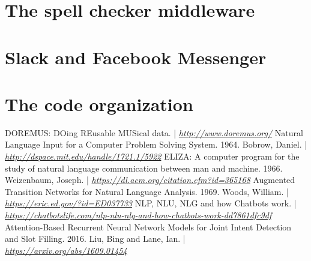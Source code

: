 \documentclass[a4paper,12pt]{report}
\begin{document}
	\section{The spell checker middleware}
	\section{Slack and Facebook Messenger}
	\section{The code organization}
	
	\begin{thebibliography}{9}
		 DOREMUS: DOing REusable MUSical data. | \textit{\href{http://www.doremus.org/}{http://www.doremus.org/}}
		 Natural Language Input for a Computer Problem Solving System. 1964. Bobrow, Daniel. | \textit{\href{http://dspace.mit.edu/handle/1721.1/5922}{http://dspace.mit.edu/handle/1721.1/5922}}
		 ELIZA: A computer program for the study of natural language communication between man and machine. 1966. Weizenbaum, Joseph. | \textit{\href{https://dl.acm.org/citation.cfm?id=365168}{https://dl.acm.org/citation.cfm?id=365168}}
		 Augmented Transition Networks for Natural Language Analysis. 1969. Woods, William. | \textit{\href{https://eric.ed.gov/?id=ED037733}{https://eric.ed.gov/?id=ED037733}}
		 NLP, NLU, NLG and how Chatbots work. | \textit{\href{https://chatbotslife.com/nlp-nlu-nlg-and-how-chatbots-work-dd7861dfc9df}{https://chatbotslife.com/nlp-nlu-nlg-and-how-chatbots-work-dd7861dfc9df}}
		 Attention-Based Recurrent Neural Network Models for Joint Intent Detection and Slot Filling. 2016. Liu, Bing and Lane, Ian. | \textit{\href{https://arxiv.org/abs/1609.01454}{https://arxiv.org/abs/1609.01454}}
	\end{thebibliography}
\end{document}
